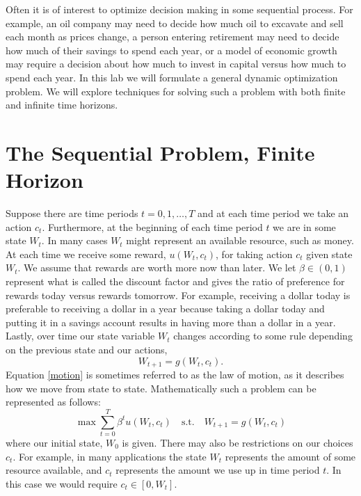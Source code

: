 
Often it is of interest to optimize decision making in some sequential process.  For example, an oil company may need to decide how much oil to excavate and sell each month as prices change, a person entering retirement may need to decide how much of their savings to spend each year, or a model of economic growth may require a decision about how much to invest in capital versus how much to spend each year.  In this lab we will formulate a general dynamic optimization problem.  We will explore techniques for solving such a problem with both finite and infinite time horizons.

\section*{The Sequential Problem, Finite Horizon}
Suppose there are time periods $t=0,1,\ldots, T$ and at each time period we take an action $c_t$. Furthermore, at the beginning of each time period $t$ we are in some state $W_t$.  In many cases $W_t$ might represent an available resource, such as money.  At each time we receive some reward, $u(W_t,c_t)$, for taking action $c_t$ given state $W_t$.  We assume that rewards are worth more now than later. We let $\beta\in (0,1)$ represent what is called the discount factor and gives the ratio of preference for rewards today versus rewards tomorrow.  For example, receiving a dollar today is preferable to receiving a dollar in a year because taking a dollar today and putting it in a  savings account results in having more than a dollar in a year.  Lastly, over time our state variable $W_t$ changes according to some rule depending on the previous state and our actions,
\begin{equation}
\label{motion}
W_{t+1} = g(W_t,c_t).
\end{equation}
Equation \eqref{motion} is sometimes referred to as the law of motion, as it describes how we move from state to state.
Mathematically such a problem can be represented as follows:
\begin{equation*}
\max \sum_{t=0}^T \beta^t u(W_t,c_t) \quad \text{s.t.} \quad W_{t+1} = g(W_t,c_t)
\end{equation*}
where our initial state, $W_0$ is given.  There may also be restrictions on our choices $c_t$.  For example, in many applications the state $W_t$ represents the amount of some resource available, and $c_t$ represents the amount we use up in time period $t$.  In this case we would require $c_t \in [0,W_t]$.

